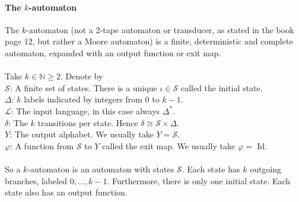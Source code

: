 \documentclass{article}
\begin{document}
\paragraph{The $k$-automaton}
The $k$-automaton (not a 2-tape automaton or transducer, as stated in the
book \cite{Fogg} page 12, but rather a Moore automaton) is a finite, 
deterministic and complete automaton, expanded with an output function or 
exit map.\\
\\
Take $k \in \mathbb{N} \ge 2$. Denote by\\
$\mathcal{S}$: A finite set of states. There is a unique 
$\iota \in \mathcal{S}$ called the initial state.\\
$\Delta$: $k$ labels indicated by integers from 0 to $k - 1$.\\
$\mathcal{L}$: The input language, in this case always $\Delta^*$.\\
$\delta$: The $k$ transitions per state. Hence 
$\delta \cong \mathcal{S} \times \Delta$.\\
$Y$: The output alphabet. We usually take $Y = \mathcal{S}$.\\
$\varphi$: A function from $\mathcal{S}$ to $Y$ called the exit map. We
           usually take $\varphi =$ Id.\\
\\
So a $k$-automaton is an automaton with states $\mathcal{S}$. Each state has
$k$ outgoing branches, labeled $0, \ldots, k - 1$. Furthermore, there is only
one initial state. Each state also has an output function.
\end{document}
